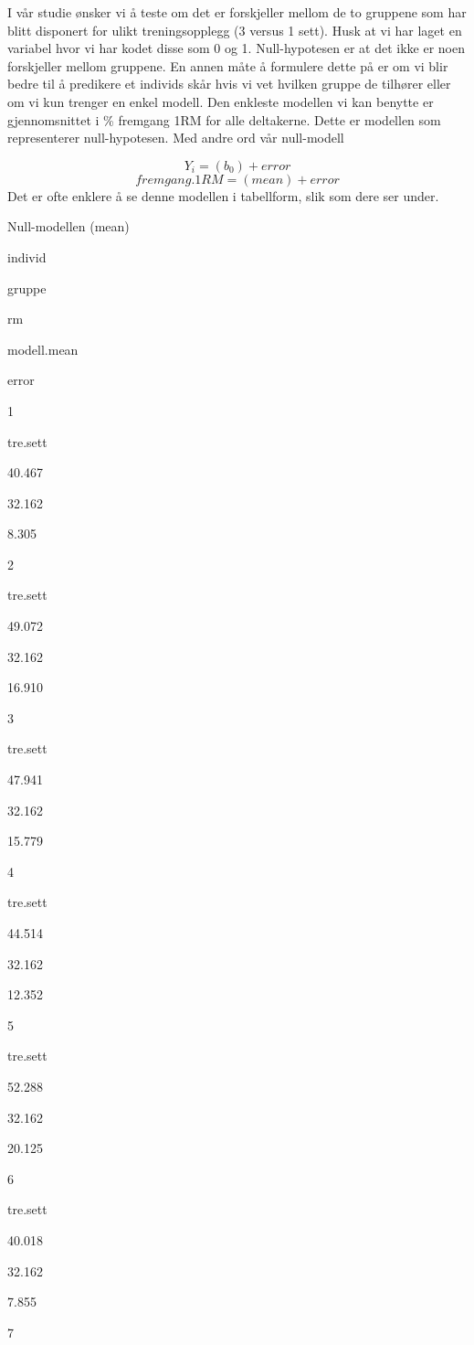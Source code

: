 \documentclass[
]{book}
\begin{document}
I vår studie ønsker vi å teste om det er forskjeller mellom de to gruppene som har blitt disponert for ulikt treningsopplegg (3 versus 1 sett). Husk at vi har laget en variabel hvor vi har kodet disse som 0 og 1. Null-hypotesen er at det ikke er noen forskjeller mellom gruppene. En annen måte å formulere dette på er om vi blir bedre til å predikere et individs skår hvis vi vet hvilken gruppe de tilhører eller om vi kun trenger en enkel modell. Den enkleste modellen vi kan benytte er gjennomsnittet i \% fremgang 1RM for alle deltakerne. Dette er modellen som representerer null-hypotesen. Med andre ord vår null-modell

\[
Y_i = (b_0) + error
\]
\[
fremgang.1RM = (mean) + error
\]
Det er ofte enklere å se denne modellen i tabellform, slik som dere ser under.

\label{tab:unnamed-chunk-6}Null-modellen (mean)

individ

gruppe

rm

modell.mean

error

1

tre.sett

40.467

32.162

8.305

2

tre.sett

49.072

32.162

16.910

3

tre.sett

47.941

32.162

15.779

4

tre.sett

44.514

32.162

12.352

5

tre.sett

52.288

32.162

20.125

6

tre.sett

40.018

32.162

7.855

7
\end{document}
